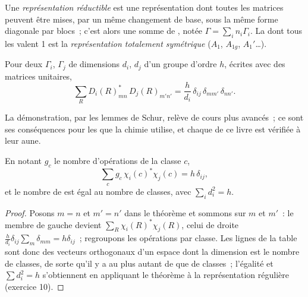 \begin{definition}\label{def:b3:group-theory-applied:reducible}
Une \emph{représentation réductible} est une
représentation dont toutes les matrices peuvent être mises, par un même
changement de base, sous la même forme diagonale par blocs~; c'est alors
une somme de ,
notée $\Gamma = \sum_in_i\Gamma_i$. La  dont
tous les  valent 1 est la \emph{représentation totalement
symétrique} ($A_1$, $A_{1g}$,
$A_1'$\dots).
\end{definition}

\begin{theorem}\label{thm:b3:group-theory-applied:great-orthogonality}
Pour deux  $\Gamma_i$, $\Gamma_j$ de
dimensions $d_i$,
$d_j$ d'un groupe d'ordre $h$, écrites avec des matrices unitaires,
\[
\sum_R D_i(R)_{mn}^*\,D_j(R)_{m'n'} = \frac{h}{d_i}\,\delta_{ij}\,\delta_{mm'}\,\delta_{nn'}.
\]
\end{theorem}
\admitted

La démonstration, par les lemmes de Schur, relève de cours plus avancés~;
ce sont ses conséquences pour les  que la chimie utilise, et
chaque  de ce livre est vérifiée à leur aune.

\begin{corollary}\label{cor:b3:group-theory-applied:characters}
En notant $g_c$ le nombre d'opérations de la classe $c$,
\[
\sum_cg_c\,\chi_i(c)^*\chi_j(c) = h\,\delta_{ij},
\]
et le nombre de  est égal au nombre de
classes,
avec $\sum_id_i^2 = h$.
\end{corollary}

\begin{proof}
Posons $m = n$ et $m' = n'$ dans le théorème et sommons sur $m$ et $m'$~:
le membre de gauche devient $\sum_R\chi_i(R)^*\chi_j(R)$, celui de droite $\frac{h}{d_i}\delta_{ij}
\sum_{m}\delta_{mm} = h\delta_{ij}$~; regroupons les opérations par
classe. Les lignes de la table sont donc des vecteurs orthogonaux d'un
espace dont la dimension est le nombre de classes, de sorte qu'il y a au
plus autant de  que de classes~; l'égalité
et $\sum d_i^2 = h$ s'obtiennent en appliquant le théorème à la
représentation régulière (exercice 10).
\end{proof}

